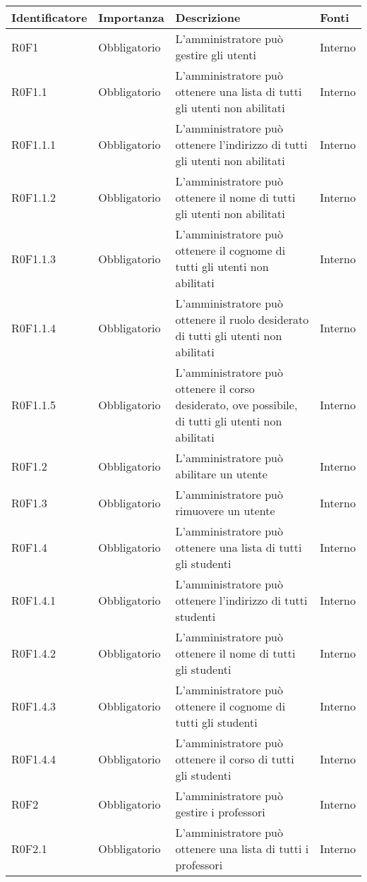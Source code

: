 \documentclass[AnalisiDeiRequisiti.tex]{subfiles}
\begin{document}
\label{table:Tabella requisiti funzionali}
\renewcommand*{\arraystretch}{1.2}
\begin{longtable}[H]{p{2.6cm}p{2.5cm}p{5cm}p{2cm}}
	\rowcolor{CHeader} 
	\color{CHeaderText} \textbf{Identificatore} & \color{CHeaderText} \textbf{Importanza} & \color{CHeaderText} \textbf{Descrizione} & \color{CHeaderText} \textbf{Fonti} \\
	\endhead
	R0F1 & Obbligatorio & L'amministratore può gestire gli utenti & Interno \\
	R0F1.1 & Obbligatorio & L'amministratore può ottenere una lista di tutti gli utenti non abilitati & Interno \\
	R0F1.1.1 & Obbligatorio & L'amministratore può ottenere l'indirizzo di tutti gli utenti non abilitati & Interno \\
	R0F1.1.2 & Obbligatorio & L'amministratore può ottenere il nome di tutti gli utenti non abilitati & Interno \\
	R0F1.1.3 & Obbligatorio & L'amministratore può ottenere il cognome di tutti gli utenti non abilitati & Interno \\
	R0F1.1.4 & Obbligatorio & L'amministratore può ottenere il ruolo desiderato di tutti gli utenti non abilitati & Interno \\
	R0F1.1.5 & Obbligatorio & L'amministratore può ottenere il corso desiderato, ove possibile, di tutti gli utenti non abilitati & Interno \\
	R0F1.2 & Obbligatorio & L'amministratore può abilitare un utente & Interno \\
	R0F1.3 & Obbligatorio & L'amministratore può rimuovere un utente & Interno \\
	R0F1.4 & Obbligatorio & L'amministratore può ottenere una lista di tutti gli studenti & Interno \\
	R0F1.4.1 & Obbligatorio & L'amministratore può ottenere l'indirizzo di tutti studenti & Interno \\
	R0F1.4.2 & Obbligatorio & L'amministratore può ottenere il nome di tutti gli studenti & Interno \\
	R0F1.4.3 & Obbligatorio & L'amministratore può ottenere il cognome di tutti gli studenti & Interno \\
	R0F1.4.4 & Obbligatorio & L'amministratore può ottenere il corso di tutti gli studenti & Interno \\
	R0F2 & Obbligatorio & L'amministratore può gestire i professori & Interno \\
	R0F2.1 & Obbligatorio & L'amministratore può ottenere una lista di tutti i professori & Interno \\

\end{longtable}
\end{document}
